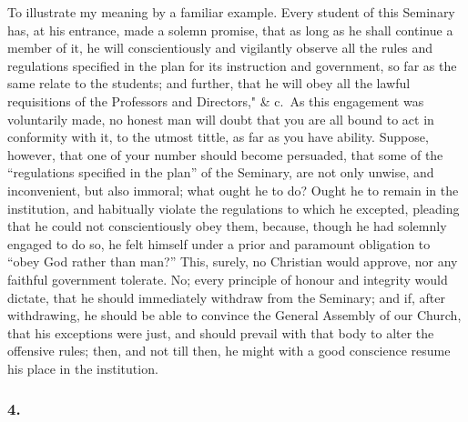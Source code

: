 \documentclass[
]{book}
\begin{document}
To illustrate my meaning by a familiar example. Every student of this Seminary has, at his entrance, made a solemn promise, that as long as he shall continue a member of it, he will conscientiously and vigilantly observe all the rules and regulations specified in the plan for its instruction and government, so far as the same relate to the students; and further, that he will obey all the lawful requisitions of the Professors and Directors," \& c.~As this engagement was voluntarily made, no honest man will doubt that you are all bound to act in conformity with it, to the utmost tittle, as far as you have ability. Suppose, however, that one of your number should become persuaded, that some of the ``regulations specified in the plan'' of the Seminary, are not only unwise, and inconvenient, but also immoral; what ought he to do? Ought he to remain in the institution, and habitually violate the regulations to which he excepted, pleading that he could not conscientiously obey them, because, though he had solemnly engaged to do so, he felt himself under a prior and paramount obligation to ``obey God rather than man?'' This, surely, no Christian would approve, nor any faithful government tolerate. No; every principle of honour and integrity would dictate, that he should immediately withdraw from the Seminary; and if, after withdrawing, he should be able to convince the General Assembly of our Church, that his exceptions were just, and should prevail with that body to alter the offensive rules; then, and not till then, he might with a good conscience resume his place in the institution.

\hypertarget{section-15}{%
\subsubsection*{4.}\label{section-15}}
\end{document}
